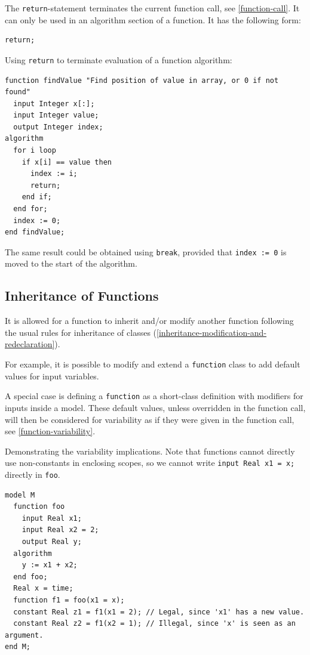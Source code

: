 The \lstinline!return!-statement terminates the current function call, see \cref{function-call}.
It can only be used in an algorithm section of a function.
It has the following form:
\begin{lstlisting}[language=modelica]
return;
\end{lstlisting}

\begin{example}
Using \lstinline!return! to terminate evaluation of a function algorithm:
\begin{lstlisting}[language=modelica]
function findValue "Find position of value in array, or 0 if not found"
  input Integer x[:];
  input Integer value;
  output Integer index;
algorithm
  for i loop
    if x[i] == value then
      index := i;
      return;
    end if;
  end for;
  index := 0;
end findValue;
\end{lstlisting}
The same result could be obtained using \lstinline!break!, provided that \lstinline!index := 0! is moved to the start of the algorithm.
\end{example}

\subsection{Inheritance of Functions}\label{inheritance-of-functions}

It is allowed for a function to inherit and/or modify another function following the usual rules for inheritance of classes (\cref{inheritance-modification-and-redeclaration}).

\begin{nonnormative}
For example, it is possible to modify and extend a \lstinline!function! class to add default values for input variables.
\end{nonnormative}

A special case is defining a \lstinline!function! as a short-class definition with modifiers for inputs inside a model.
These default values, unless overridden in the function call, will then be considered for variability as if they were given in the function call, see \cref{function-variability}.

\begin{example}
Demonstrating the variability implications.
Note that functions cannot directly use non-constants in enclosing scopes, so we cannot write \lstinline!input Real x1 = x;! directly in \lstinline!foo!.
\begin{lstlisting}[language=modelica]
model M
  function foo
    input Real x1;
    input Real x2 = 2;
    output Real y;
  algorithm
    y := x1 + x2;
  end foo;
  Real x = time;
  function f1 = foo(x1 = x);
  constant Real z1 = f1(x1 = 2); // Legal, since 'x1' has a new value.
  constant Real z2 = f1(x2 = 1); // Illegal, since 'x' is seen as an argument.
end M;
\end{lstlisting}
\end{example}

